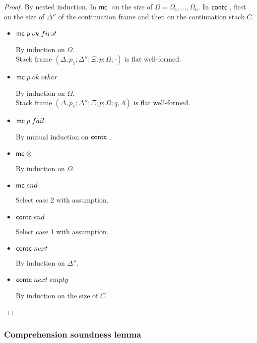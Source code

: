 \begin{proof}
   By nested induction. In $\mathsf{mc} \;$ on the size of $\Omega = \Omega_1, ..., \Omega_n$. In $\mathsf{contc} \;$, first on the size of $\Delta''$ of the continuation frame and then on the continuation stack $C$.
   
   \begin{itemize}
      \item $\mathsf{mc} \; p \; ok \; first$
      
      By induction on $\Omega$.\\
      Stack frame $(\Delta, p_1; \Delta''; \Xi; p; \Omega; \cdot)$ is flat well-formed. \\
      
      \item $\mathsf{mc} \; p \; ok \; other$
      
      By induction on $\Omega$.\\
      Stack frame $(\Delta, p_1; \Delta''; \Xi; p; \Omega; q, \Lambda)$ is flat well-formed.
      
      \item $\mathsf{mc} \; p \; fail$
      
      By mutual induction on $\mathsf{contc} \;$.
      
      \item $\mathsf{mc} \; \otimes$
      
      By induction on $\Omega$. \\
      
      \item $\mathsf{mc} \; end$
      
      Select case 2 with assumption.
      
      \item $\mathsf{contc} \; end$
      
      Select case 1 with assumption.
      
      \item $\mathsf{contc} \; next$
      
      By induction on $\Delta''$.\\
      
      \item $\mathsf{contc} \; next \; empty$
      
      By induction on the size of $C$.
      
   \end{itemize}
\end{proof}

\subsubsection{Comprehension soundness lemma}

